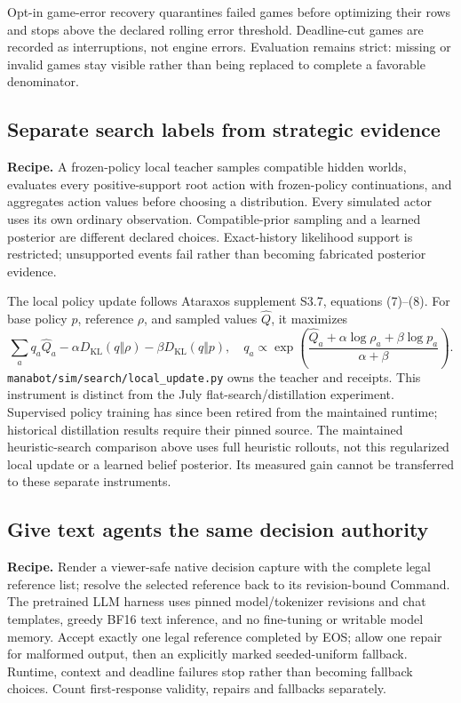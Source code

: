 \documentclass[11pt]{article}
\newcommand{\code}[1]{\texttt{\small #1}}
\begin{document}
Opt-in game-error recovery quarantines failed games before optimizing their rows and stops above the declared rolling error threshold. Deadline-cut games are recorded as interruptions, not engine errors. Evaluation remains strict: missing or invalid games stay visible rather than being replaced to complete a favorable denominator.

\subsection{Separate search labels from strategic evidence}

\textbf{Recipe.} A frozen-policy local teacher samples compatible hidden worlds, evaluates every positive-support root action with frozen-policy continuations, and aggregates action values before choosing a distribution. Every simulated actor uses its own ordinary observation. Compatible-prior sampling and a learned posterior are different declared choices. Exact-history likelihood support is restricted; unsupported events fail rather than becoming fabricated posterior evidence.

The local policy update follows Ataraxos supplement S3.7, equations (7)--(8). For base policy $p$, reference $\rho$, and sampled values $\widehat Q$, it maximizes
\[
 \sum_a q_a\widehat Q_a-\alpha D_{\mathrm{KL}}(q\Vert\rho)
                         -\beta D_{\mathrm{KL}}(q\Vert p),
 \quad
 q_a\propto\exp\!\left(\frac{\widehat Q_a+\alpha\log\rho_a+\beta\log p_a}
                                  {\alpha+\beta}\right).
\]
\code{manabot/sim/search/local\_update.py} owns the teacher and receipts. This instrument is distinct from the July flat-search/distillation experiment. Supervised policy training has since been retired from the maintained runtime; historical distillation results require their pinned source. The maintained heuristic-search comparison above uses full heuristic rollouts, not this regularized local update or a learned belief posterior. Its measured gain cannot be transferred to these separate instruments.

\subsection{Give text agents the same decision authority}

\textbf{Recipe.} Render a viewer-safe native decision capture with the complete legal reference list; resolve the selected reference back to its revision-bound Command. The pretrained LLM harness uses pinned model/tokenizer revisions and chat templates, greedy BF16 text inference, and no fine-tuning or writable model memory. Accept exactly one legal reference completed by EOS; allow one repair for malformed output, then an explicitly marked seeded-uniform fallback. Runtime, context and deadline failures stop rather than becoming fallback choices. Count first-response validity, repairs and fallbacks separately.
\end{document}
